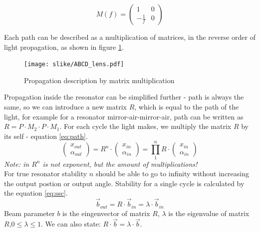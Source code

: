 \begin{equation}
    M(f) = \begin{pmatrix}
        1 & 0 \\ -\frac{1}{f} & 0
    \end{pmatrix}
\label{eq:mlpm}
\end{equation}

Each path can be described as a multiplication of matrices, in the reverse order of light propagation, as shown in figure \ref{fig:abcdl}.
\begin{figure}[h!]
    \centering
    \texttt{[image: slike/ABCD\_lens.pdf]}
    \caption{Propagation description by matrix multiplication}
    \label{fig:abcdl}
\end{figure}

Propagation inside the resonator can be simplified further - path is always the same, so we can introduce a new matrix $R$,
which is equal to the path of the light, for example for a resonator mirror-air-mirror-air, path  can be written as $R = P \cdot M_2 \cdot P \cdot M_1$.
For each cycle the light makes, we multiply the matrix $R$ by its self - equation \ref{eq:path}.
\begin{equation}
    \begin{pmatrix}
        x_{out} \\ \alpha_{out}
    \end{pmatrix} = R^n \cdot \begin{pmatrix}
        x_{in} \\ \alpha_{in}
    \end{pmatrix} = \prod_{1}^{n} R \cdot \begin{pmatrix}
        x_{in} \\ \alpha_{in}
    \end{pmatrix}
    \label{eq:path}
\end{equation}
\textit{Note: in $R^n$ is not exponent, but the amount of multiplications!}\\

For true resonator stability $n$ should be able to go to infinity without increasing the output postion or output angle.
Stability for a single cycle is calculated by the equation \ref{eq:ssc}.
\begin{equation}
    \vec{b}_{out} = R \cdot \vec{b}_{in} = \lambda \cdot  \vec{b}_{in}
    \label{eq:ssc}
\end{equation}
Beam parameter $b$ is the eingenvector of matrix $R$, $\lambda$ is the eigenvalue of matrix $R$,$0 \le \lambda \le 1$.
We can also state: $R \cdot \vec{b} = \lambda \cdot \vec{b}$.

